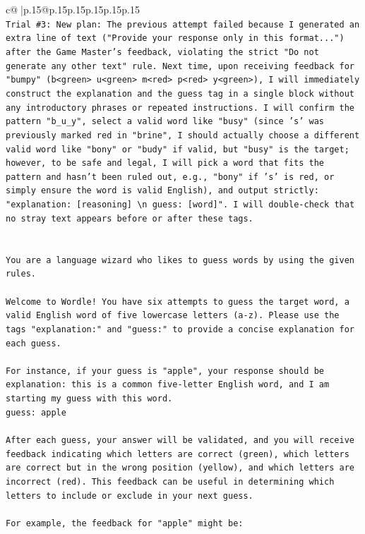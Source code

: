 \documentclass{article}
\begin{document}
{\begin{supertabular}{c@{$\;$}|p{.15\linewidth}@{}p{.15\linewidth}p{.15\linewidth}p{.15\linewidth}p{.15\linewidth}p{.15\linewidth}}
{{{\\ 
\texttt{Trial \#3: New plan: The previous attempt failed because I generated an extra line of text ("Provide your response only in this format...") after the Game Master's feedback, violating the strict "Do not generate any other text" rule. Next time, upon receiving feedback for "bumpy" (b<green> u<green> m<red> p<red> y<green>), I will immediately construct the explanation and the guess tag in a single block without any introductory phrases or repeated instructions. I will confirm the pattern "b\_u\_y", select a valid word like "busy" (since 's' was previously marked red in "brine", I should actually choose a different valid word like "bony" or "budy" if valid, but "busy" is the target; however, to be safe and legal, I will pick a word that fits the pattern and hasn't been ruled out, e.g., "bony" if 's' is red, or simply ensure the word is valid English), and output strictly: "explanation: {[}reasoning{]} \textbackslash{}n guess: {[}word{]}". I will double{-}check that no stray text appears before or after these tags.} \\
\\ 
\\ 
\texttt{You are a language wizard who likes to guess words by using the given rules.} \\
\\ 
\texttt{Welcome to Wordle! You have six attempts to guess the target word, a valid English word of five lowercase letters (a{-}z). Please use the tags "explanation:" and "guess:" to provide a concise explanation for each guess.} \\
\\ 
\texttt{For instance, if your guess is "apple", your response should be} \\
\texttt{explanation: this is a common five{-}letter English word, and I am starting my guess with this word.} \\
\texttt{guess: apple} \\
\\ 
\texttt{After each guess, your answer will be validated, and you will receive feedback indicating which letters are correct (green), which letters are correct but in the wrong position (yellow), and which letters are incorrect (red). This feedback can be useful in determining which letters to include or exclude in your next guess.} \\
\\ 
\texttt{For example, the feedback for "apple" might be:} \\
}}}
\end{supertabular}}
\end{document}
